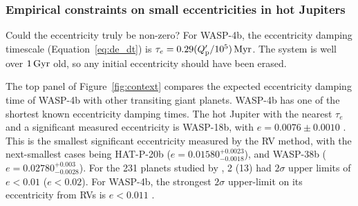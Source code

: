\documentclass[12pt,twocolumn,tighten]{aastex62}
\begin{document}
\subsubsection{Empirical constraints on small eccentricities in hot
Jupiters}

Could the eccentricity truly be non-zero?  For WASP-4b, the eccentricity
damping timescale (Equation~\ref{eq:de_dt}) is $\tau_e = 0.29 (Q_{\rm
p}'/10^5) \, {\rm Myr}$.  The system is well over $1\,{\rm
Gyr}$ \citep{winn_transit_2009} old, so any initial eccentricity should
have been erased.

The top panel of Figure~\ref{fig:context} compares the expected
eccentricity damping time of WASP-4b with other transiting giant
planets.  WASP-4b has one of the shortest known eccentricity damping
times.  The hot Jupiter with the nearest $\tau_e$ and a significant
measured eccentricity is WASP-18b, with $e = 0.0076 \pm 0.0010$
\citep{triaud_spin-orbit_2010,bonomo_gaps_2017}.  This is the smallest
significant eccentricity measured by the RV method, with the
next-smallest cases being HAT-P-20b ($e =
0.01580^{+0.0023}_{-0.0018}$), and WASP-38b ($e =
0.02780^{+0.003}_{-0.0028}$).  For the 231 planets studied by
\citet{bonomo_gaps_2017}, 2 (13) had $2\sigma$ upper limits of $e <
0.01$ ($e<0.02$).  For WASP-4b, the strongest $2\sigma$ upper-limit on
its eccentricity from RVs is $e<0.011$
\citep{husnoo_observational_2012,bonomo_gaps_2017}.  
\end{document}
